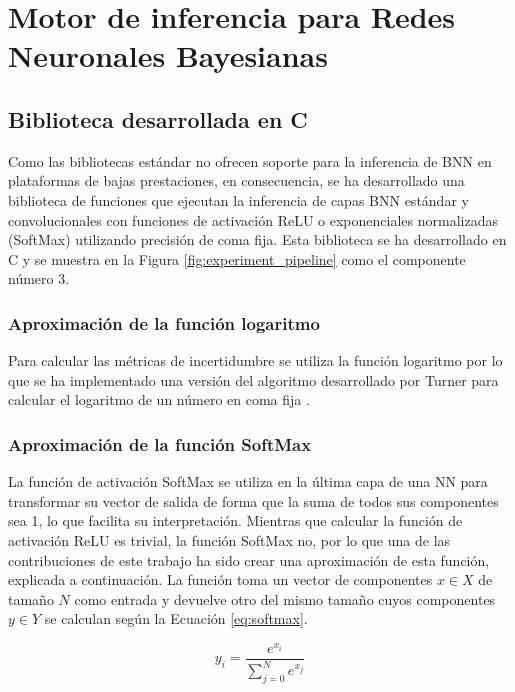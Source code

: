 \chapter{Motor de inferencia para Redes Neuronales Bayesianas} \label{ch:motor_inferencia}

\section{Biblioteca desarrollada en C}

Como las bibliotecas estándar no ofrecen soporte para la inferencia de BNN en plataformas de bajas prestaciones, en consecuencia, se ha desarrollado una biblioteca de funciones que ejecutan la inferencia de capas BNN estándar y convolucionales con funciones de activación ReLU o exponenciales normalizadas (SoftMax) utilizando precisión de coma fija. Esta biblioteca se ha desarrollado en C y se muestra en la Figura \ref{fig:experiment_pipeline} como el componente número 3.

\subsection{Aproximación de la función logaritmo}

Para calcular las métricas de incertidumbre se utiliza la función logaritmo por lo que se ha implementado una versión del algoritmo desarrollado por Turner para calcular el logaritmo de un número en coma fija \cite{binary_log}.

\subsection{Aproximación de la función SoftMax}

La función de activación SoftMax se utiliza en la última capa de una NN para transformar su vector de salida de forma que la suma de todos sus componentes sea 1, lo que facilita su interpretación. Mientras que calcular la función de activación ReLU es trivial, la función SoftMax no, por lo que una de las contribuciones de este trabajo ha sido crear una aproximación de esta función, explicada a continuación. La función toma un vector de componentes $x \in X$ de tamaño $N$ como entrada y devuelve otro del mismo tamaño cuyos componentes $y\in Y$ se calculan según la Ecuación \ref{eq:softmax}.

\begin{equation} \label{eq:softmax}
y_i = \dfrac{e^{x_i}}{\sum_{j = 0}^N e^{x_j}}
\end{equation}

